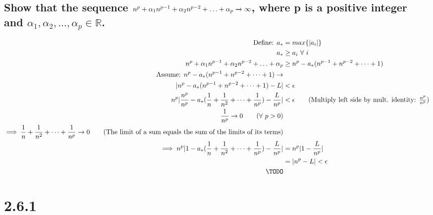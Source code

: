 \documentclass[11pt]{article}
\begin{document}
	\subsection*{Show that the sequence $n^p + \alpha_1n^{p-1} + \alpha_2n^{p-2} + \ldots + \alpha_p{} \xrightarrow{} \infty$, where p is a positive integer and $\alpha_1, \alpha_2, \ldots, \alpha_p \in \mathbb{R}$.}
	
	\begin{align*}
	\text{Define: } a_{*} &= max\{|a_i|\} \\
	a_{*} &\geq a_i\ \forall\ i \\
	\myseq{} &\geq \myseqworstcase{} \\
	\text{Assume: } \myseqworstcase{} \rightarrow \\ 
	|\myseqworstcase{} - L| &< \epsilon \\
	n^p | \frac{n^p}{n^p} - a_{*} (\myharmseq) - \frac{L}{n^p}| &< \epsilon \tag{Multiply left side by mult. identity: $\frac{n^p}{n^p}$} \\
	\frac{1}{n^p} \rightarrow 0 \tag{$\forall\ p > 0$} \\
	\implies \myharmseq \rightarrow 0 \tag{The limit of a sum equals the sum of the limits of its terms} \\
	\implies n^p | 1 - a_{*} (\myharmseq) - \frac{L}{n^p}| &= n^p | 1 - \frac{L}{n^p}| \\
	&= | n^p - L| < \epsilon \\
	\TODO \\
	\end{align*}
	
	
	\section*{2.6.1}
	\def \myintseq {\{0, -1, 1, -2, 2, \dots\}}
\end{document}
